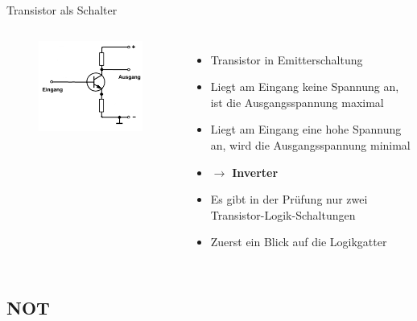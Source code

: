 \begin{frame}{Transistor als Schalter}
  \begin{columns}
    \begin{figure}
      \includegraphics[width=\textwidth,height=.7\textheight,keepaspectratio]{a14/td401_simplified.png}
    \end{figure}
    \pause
    \begin{itemize}
      \item Transistor in Emitterschaltung
      \item Liegt am Eingang keine Spannung an, ist die Ausgangsspannung maximal
      \item Liegt am Eingang eine hohe Spannung an, wird die Ausgangsspannung minimal
      \item $\rightarrow$ \textbf{Inverter}
        \pause
      \item Es gibt in der Prüfung nur zwei Transistor-Logik-Schaltungen
      \item Zuerst ein Blick auf die Logikgatter
    \end{itemize}
  \end{columns}
\end{frame}

\subsection{NOT}

